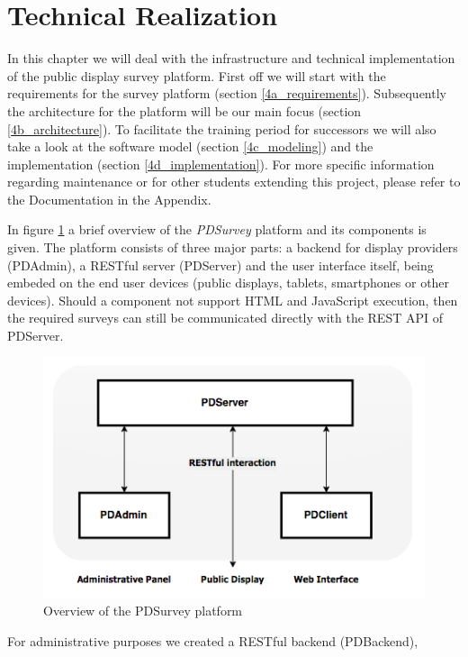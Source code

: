\section{Technical Realization}
\label{sec:implementation}

In this chapter we will deal with the infrastructure and technical implementation of the public display survey platform. First off we will start with the requirements for the survey platform (section \ref{4a_requirements}). Subsequently the architecture for the platform will be our main focus (section \ref{4b_architecture}). To facilitate the training period for successors we will also take a look at the software model (section \ref{4c_modeling}) and the implementation (section \ref{4d_implementation}). For more specific information regarding maintenance or for other students extending this project, please refer to the Documentation in the Appendix.

In figure \ref{fig:4-pdsurvey-platform} a brief overview of the \textit{PDSurvey} platform and its components is given. The platform consists of three major parts: a backend for display providers (PDAdmin), a RESTful server (PDServer) and the user interface itself, being embeded on the end user devices (public displays, tablets, smartphones or other devices). Should a component not support HTML and JavaScript execution, then the required surveys can still be communicated directly with the REST API of PDServer.

\begin{figure}%
    \begin{center}
        \includegraphics[width=.7\columnwidth]{img/4_implementation/4-overview}
    \end{center}
 \caption{Overview of the PDSurvey platform}
 \label{fig:4-pdsurvey-platform}
\end{figure}

 For administrative purposes we created a RESTful backend (PDBackend), 


